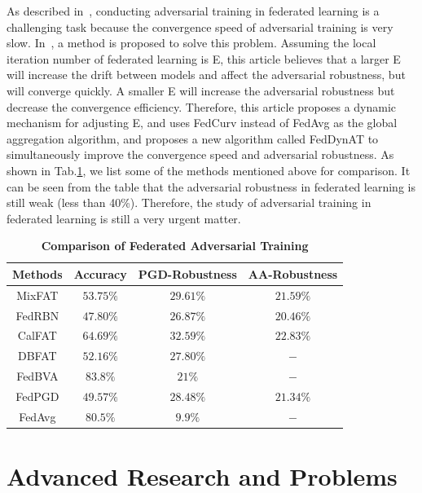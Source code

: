 \documentclass[a4paper,fleqn]{cas-dc}
\begin{document}
As described in~\cite{zhang2023delving}, conducting adversarial training
in federated learning is a challenging task because the
convergence speed of adversarial training is very slow.
In~\cite{shah2021adversarial}, a method is proposed to solve this problem.
Assuming the local iteration number of federated learning
is E, this article believes that a larger E will increase the
drift between models and affect the adversarial robustness,
but will converge quickly. A smaller E will increase
the adversarial robustness but decrease the convergence
eﬀiciency. Therefore, this article proposes a dynamic
mechanism for adjusting E, and uses FedCurv instead of
FedAvg as the global aggregation algorithm, and proposes
a new algorithm called FedDynAT to simultaneously
improve the convergence speed and adversarial robustness.
As shown in Tab.\ref{Comparison of FAT}, we list some of the methods
mentioned above for comparison. It can be seen from the
table that the adversarial robustness in federated learning
is still weak (less than 40\%). Therefore, the study of
adversarial training in federated learning is still a very
urgent matter.

\begin{table}[t]
    \caption{\textbf{Comparison of Federated Adversarial Training}}
    \label{Comparison of FAT}
    \centering
    \begin{tabular}{|c|c|c|c|} %
    \toprule %
    \textbf{Methods}  & \textbf{Accuracy} & \textbf{PGD-Robustness} & \textbf{AA-Robustness}\\ 
    \midrule
     MixFAT& $53.75\%$ &   $29.61\%$ &   $21.59\%$ \\
     \midrule
     FedRBN& $47.80\%$ &  $26.87\%$ & $20.46\%$ \\
     \midrule
     CalFAT& $64.69\%$ & $32.59\%$  & $22.83\%$ \\
     \midrule
     DBFAT& $52.16\%$ &  $27.80\%$ & $-$ \\
     \midrule
     FedBVA& $83.8\%$ &  $21\%$ & $-$ \\
     \midrule
     FedPGD& $49.57\%$ &  $28.48\%$ &  $21.34\%$ \\
     \midrule
     FedAvg& $80.5\%$ &  $9.9\%$ & $-$ \\
    \toprule
    \end{tabular}
    \end{table}  

    \section{Advanced Research and Problems}
    \label{Advanced Research and Problems}
\end{document}
